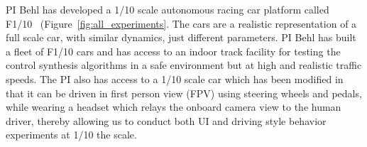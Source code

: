 PI Behl has developed a 1/10 scale autonomous racing car platform called F1/10~\cite{f1tenth} (Figure~\ref{fig:all_experiments}. The cars are a realistic representation of a full scale car, with similar dynamics, just different parameters. %
PI Behl has built a fleet of F1/10 cars and has access to an indoor track facility for testing the control synthesis algorithms in a safe environment but at high and realistic traffic speeds. The PI also has access to a 1/10 scale car which has been modified in that it can be driven in first person view (FPV) using steering wheels and pedals, while wearing a headset which relays the onboard camera view to the human driver, thereby allowing us to conduct both UI and driving style behavior experiments at 1/10 the scale.

